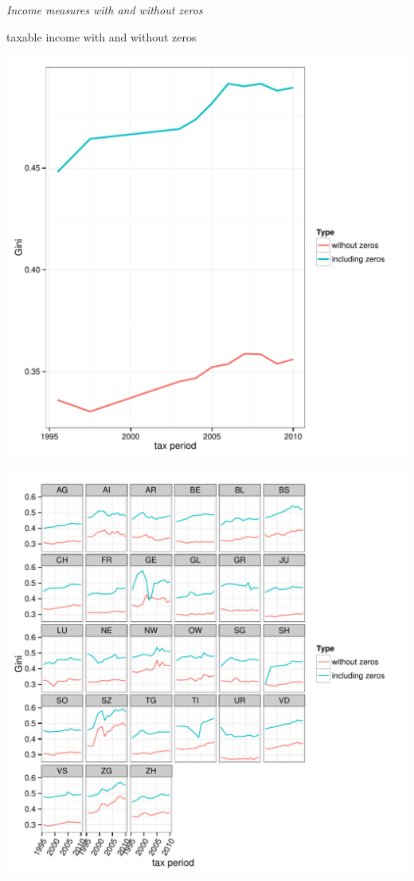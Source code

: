\documentclass[twoside]{article}\usepackage[]{graphicx}\usepackage[]{color}
\makeatletter
\def\maxwidth{ %
  \ifdim\Gin@nat@width>\linewidth
    \linewidth
  \else
    \Gin@nat@width
  \fi
}
\newenvironment{knitrout}{}{} %
\makeatother
\begin{document}
\begin{multicols}{2}
\emph{Income measures with and without zeros}

taxable income with and without zeros

\begin{knitrout}
\color{fgcolor}
\includegraphics[width=\maxwidth]{figure/with_without_zeros1} 

\includegraphics[width=\maxwidth]{figure/with_without_zeros2} 


\end{knitrout}
\end{multicols}
\end{document}
